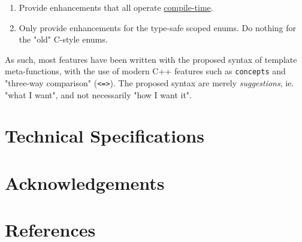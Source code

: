 \documentclass[
  format=manuscript,
  screen=true,
  review=false,
  nonacm=true,
  timestamp=true,
  balance=false]{acmart}
\begin{document}
\begin{enumerate}
\item Provide enhancements that all operate \underline{compile-time}.
\item Only provide enhancements for the type-safe scoped enums. Do nothing for the "old" C-style enums.
\end{enumerate}

\noindent
As such, most features have been written with the proposed syntax of template
meta-functions, with the use of modern C++ features such as \texttt{concepts} and
"three-way comparison" (\texttt{<=>}). The proposed syntax are merely
\textit{suggestions}, ie. "what I want", and not necessarily "how I want it".


\section{Technical Specifications}

\section{Acknowledgements}

\section{References}




\end{document}
